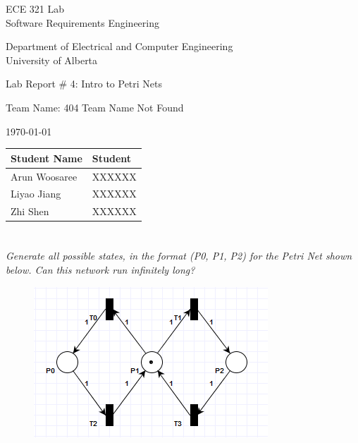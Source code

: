 \documentclass[letterpaper]{article}
\begin{document}
\begin{titlepage}
 \begin{center}

  \LARGE
  ECE 321 Lab\\ Software Requirements Engineering
  
  Department of Electrical and Computer Engineering\\
  
  University of Alberta
  
  \vspace{2cm}
  
  Lab Report \# 4: Intro to Petri Nets
  
  \vspace{2cm}
  
  Team Name: 404 Team Name Not Found
  
  \vspace{2cm}
  
  \today
  
  \vspace{2cm}
  \Large
  
  \begin{tabular}{ | m{5cm} | m{5cm} | }
   \hline
   Student Name  & Student \\
   \hline
   Arun Woosaree & XXXXXX  \\
   \hline
   Liyao Jiang   & XXXXXX  \\
   \hline
   Zhi Shen      & XXXXXX  \\
   \hline
  \end{tabular}
  
  
  
 \end{center}
\end{titlepage}


\section{}

\textit{Generate all possible states, in the format (P0, P1, P2) for the Petri Net shown below. Can this network run infinitely long?}

\begin{figure}[H]
 \centering
 \includegraphics[width=\textwidth]{image1.png}
\end{figure}
\end{document}
